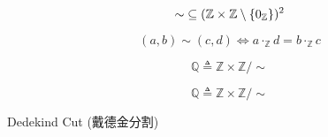 \begin{frame}{}
  \begin{definition}
    \[
      \sim\; \subseteq (\mathbb{Z} \times \mathbb{Z} \setminus \{0_{\mathbb{Z}}\})^{2}
    \]

    \[
      (a, b) \sim (c, d) \iff a \cdot_{\mathbb{Z}} d = b \cdot_{\mathbb{Z}} c
    \]
  \end{definition}

  \pause
  \vspace{0.30cm}
  \begin{definition}[$\mathbb{Q}$]
    \[
      \mathbb{Q} \triangleq \mathbb{Z} \times \mathbb{Z}/\sim
    \]
  \end{definition}
\end{frame}

\begin{frame}{}
  \[
    \mathbb{Q} \triangleq \mathbb{Z} \times \mathbb{Z}/\sim
  \]
\end{frame}

\begin{frame}{}
  \begin{center}
  \end{center}

  \pause
  \begin{center}
    Dedekind Cut (戴德金分割)
  \end{center}
\end{frame}
